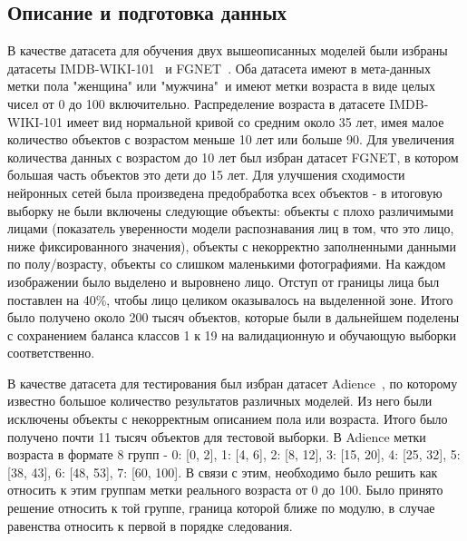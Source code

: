 \subsection{Описание и подготовка данных}\label{subsec:описание-данных}
В качестве датасета для обучения двух вышеописанных моделей были избраны датасеты IMDB-WIKI-101~\cite{imdb_db} и FGNET~\cite{fgnet}.
Оба датасета имеют в мета-данных метки пола "женщина" или "мужчина"\, и имеют метки возраста в виде целых чисел от 0 до 100 включительно.
Распределение возраста в датасете IMDB-WIKI-101 имеет вид нормальной кривой со средним около 35 лет,
имея малое количество объектов с возрастом меньше 10 лет или больше 90.
Для увеличения количества данных с возрастом до 10 лет был избран датасет FGNET, в котором большая часть объектов это дети до 15 лет.
Для улучшения сходимости нейронных сетей была произведена предобработка всех объектов -
в итоговую выборку не были включены следующие объекты:
объекты с плохо различимыми лицами (показатель уверенности модели распознавания лиц в том, что это лицо, ниже фиксированного значения),
объекты с некорректно заполненными данными по полу/возрасту,
объекты со слишком маленькими фотографиями.
На каждом изображении было выделено и выровнено лицо.
Отступ от границы лица был поставлен на 40\%, чтобы лицо целиком оказывалось на выделенной зоне.
Итого было получено около 200 тысяч объектов, которые были в дальнейшем поделены
с сохранением баланса классов 1 к 19 на валидационную и обучающую выборки соответственно.
\par В качестве датасета для тестирования был избран датасет Adience~\cite{adience}, по которому известно большое количество результатов различных моделей.
Из него были исключены объекты с некорректным описанием пола или возраста.
Итого было получено почти 11 тысяч объектов для тестовой выборки.
В Adience метки возраста в формате 8 групп - 0: [0, 2], 1: [4, 6], 2: [8, 12], 3: [15, 20], 4: [25, 32], 5: [38, 43], 6: [48, 53], 7: [60, 100].
В связи с этим, необходимо было решить как относить к этим группам метки реального возраста от 0 до 100.
Было принято решение относить к той группе, граница которой ближе по модулю, в случае равенства относить к первой в порядке следования.

